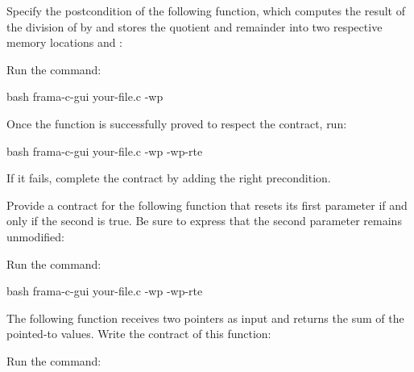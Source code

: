 




Specify the postcondition of the following function, which computes the
result of the division of  by  and stores
the quotient and remainder into two respective memory locations
 and :



Run the command:

\begin{CodeBlock}{bash}
frama-c-gui your-file.c -wp
\end{CodeBlock}


Once the function is successfully proved to respect the contract, run:


\begin{CodeBlock}{bash}
frama-c-gui your-file.c -wp -wp-rte
\end{CodeBlock}


If it fails, complete the contract by adding the right precondition.








Provide a contract for the following function that resets its first parameter
if and only if the second is true. Be sure to express that the second parameter
remains unmodified:




Run the command:


\begin{CodeBlock}{bash}
frama-c-gui your-file.c -wp -wp-rte
\end{CodeBlock}






The following function receives two pointers as input and returns the
sum of the pointed-to values. Write the contract of this function:






Run the command:



